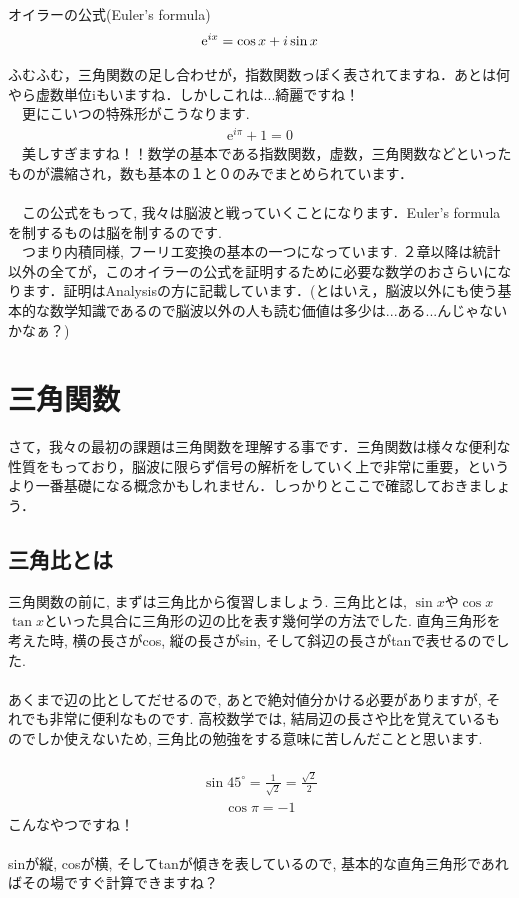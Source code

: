 \documentclass[11pt,a4paper]{ujreport}
\begin{document}
\begin{screen}
オイラーの公式(Euler's formula)
\begin{eqnarray}
\mathrm{e}^{ix} = \cos x + \mathstrut i\sin x
\label{eq:euler}
\end{eqnarray}
\end{screen}

ふむふむ，三角関数の足し合わせが，指数関数っぽく表されてますね．あとは何やら虚数単位iもいますね．しかしこれは...綺麗ですね！\\
　更にこいつの特殊形がこうなります.\\
\begin{eqnarray}
\mathrm{e}^{i\pi} + 1 = 0
\end{eqnarray}
　美しすぎますね！！数学の基本である指数関数，虚数，三角関数などといったものが濃縮され，数も基本の１と０のみでまとめられています．\\
\\
　この公式をもって, 我々は脳波と戦っていくことになります．Euler's formula を制するものは脳を制するのです.\\
　つまり内積同様, フーリエ変換の基本の一つになっています. ２章以降は統計以外の全てが，このオイラーの公式を証明するために必要な数学のおさらいになります．証明はAnalysisの方に記載しています．(とはいえ，脳波以外にも使う基本的な数学知識であるので脳波以外の人も読む価値は多少は...ある...んじゃないかなぁ？)

\chapter{三角関数 \label{trigonometry}}
さて，我々の最初の課題は三角関数を理解する事です．三角関数は様々な便利な性質をもっており，脳波に限らず信号の解析をしていく上で非常に重要，というより一番基礎になる概念かもしれません．しっかりとここで確認しておきましょう．

\section{三角比とは}
三角関数の前に, まずは三角比から復習しましょう. 三角比とは, $\sin x$や$\cos x$ $\tan x$といった具合に三角形の辺の比を表す幾何学の方法でした. 直角三角形を考えた時, 横の長さがcos, 縦の長さがsin, そして斜辺の長さがtanで表せるのでした. \\
\\

あくまで辺の比としてだせるので, あとで絶対値分かける必要がありますが, それでも非常に便利なものです. 高校数学では, 結局辺の長さや比を覚えているものでしか使えないため, 三角比の勉強をする意味に苦しんだことと思います.\\
\\
\begin{eqnarray}
\sin 45^\circ = \frac{1}{\sqrt{2}} = \frac{\sqrt{2}}2
\end{eqnarray}
\begin{eqnarray}
\cos \pi = -1
\end{eqnarray}
こんなやつですね！\\
\\
sinが縦, cosが横, そしてtanが傾きを表しているので, 基本的な直角三角形であればその場ですぐ計算できますね？\\
\end{document}
